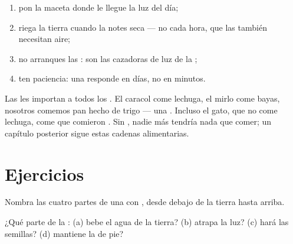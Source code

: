 \begin{method}\label{met:g1:plants-around-us:care}
\begin{enumerate}
  \item pon la maceta donde le llegue la luz del día;
  \item riega la tierra cuando la notes seca --- no cada hora, que las
         también necesitan aire;
  \item no arranques las : son las cazadoras de luz de la ;
  \item ten paciencia: una  responde en días, no en minutos.
\end{enumerate}
\end{method}

\begin{remark}\label{rem:g1:plants-around-us:food}
Las  les importan a todos los . El caracol come
lechuga, el mirlo come bayas, nosotros comemos pan hecho de trigo ---
una . Incluso el gato, que no come lechuga, come  que
comieron . Sin , nadie más tendría nada que comer; un
capítulo posterior sigue estas cadenas alimentarias.
\end{remark}

\section{Ejercicios}

\begin{exercise}[$\star$]\label{exo:g1:plants-around-us:1}
Nombra las cuatro partes de una  con , desde debajo de la
tierra hasta arriba.
\end{exercise}

\begin{exercise}[$\star$]\label{exo:g1:plants-around-us:2}
¿Qué parte de la : (a) bebe el agua de la tierra? (b) atrapa la
luz? (c) hará las semillas? (d) mantiene la  de pie?
\end{exercise}


